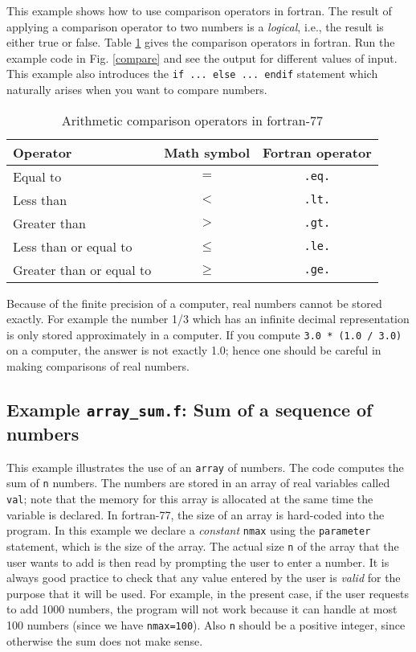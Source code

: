 \documentclass[11pt,oneside]{amsart}
\begin{document}
This example shows how to use comparison operators in fortran. The result of applying a comparison operator to two numbers is a {\em logical}, i.e., the result is either true or false. Table \ref{tab:comp} gives the comparison operators in fortran. Run the example code in Fig. \ref{compare} and see the output for different values of input. This example also introduces the {\tt if ... else ... endif} statement which naturally arises when you want to compare numbers.

\begin{table}
\begin{center}
\begin{tabular}{|l|c|c|}
\hline
Operator & Math symbol & Fortran operator \\
\hline\hline
Equal to  & $=$ & {\tt .eq.} \\
\hline
Less than & $<$ & {\tt .lt.} \\
\hline
Greater than & $>$ & {\tt .gt.} \\
\hline
Less than or equal to & $\le$ & {\tt .le.} \\
\hline
Greater than or equal to & $\ge$ & {\tt .ge.} \\
\hline
\end{tabular}
\caption{Arithmetic comparison operators in fortran-77}
\label{tab:comp}
\end{center}
\end{table}

Because of the finite precision of a computer, real numbers cannot be stored exactly. For example the number 1/3 which has an infinite decimal representation is only stored approximately in a computer. If you compute {\tt 3.0 * (1.0 / 3.0)} on a computer, the answer is not exactly 1.0; hence one should be careful in making comparisons of real numbers.

\subsection{Example {\tt array\_sum.f}: Sum of a sequence of numbers}

This example illustrates the use of an {\tt array} of numbers. The code computes the sum of {\tt n} numbers. The numbers are stored in an array of real variables called {\tt val}; note that the memory for this array is allocated at the same time the variable is declared. In fortran-77, the size of an array is hard-coded into the program. In this example we declare a {\em constant} {\tt nmax} using the {\tt parameter} statement, which is the size of the array. The actual size {\tt n} of the array that the user wants to add is then read by prompting the user to enter a number. It is always good practice to check that any value entered by the user is {\em valid} for the purpose that it will be used. For example, in the present case, if the user requests to add 1000 numbers, the program will not work because it can handle at most 100 numbers (since we have {\tt nmax=100}). Also {\tt n} should be a positive integer, since otherwise the sum does not make sense.
\end{document}
